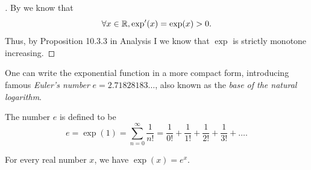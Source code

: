 \begin{proof}[]
  By  we know that
  \[
    \forall x \in \mathbb{R}, \exp'(x) = \exp(x) > 0.
  \]
  Thus, by Proposition 10.3.3 in Analysis I we know that \(\exp\) is strictly monotone increasing.
\end{proof}

\begin{note}
  One can write the exponential function in a more compact form, introducing famous \emph{Euler's number} \(e = 2.71828183 \dots\), also known as the \emph{base of the natural logarithm}.
\end{note}

\begin{defn}\label{ii:4.5.3}
  The number \(e\) is defined to be
  \[
    e = \exp(1) = \sum_{n = 0}^\infty \dfrac{1}{n!} = \dfrac{1}{0!} + \dfrac{1}{1!} + \dfrac{1}{2!} + \dfrac{1}{3!} + \dots.
  \]
\end{defn}

\begin{prop}\label{ii:4.5.4}
  For every real number \(x\), we have \(\exp(x) = e^x\).
\end{prop}

